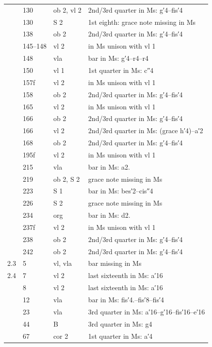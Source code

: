 \documentclass[parskip=full]{scrreprt}
\begin{document}
\begin{longtable}{lll L{10cm}}
       & 130 & ob 2, vl 2 & 2nd/3rd quarter in Ms: g′4–fis′4 \\
       & 130 & S 2     & 1st eighth: grace note missing in Ms \\
       & 138 & ob 2    & 2nd/3rd quarter in Ms: g′4–fis′4 \\
       & 145–148 & vl 2 & in Ms unison with vl 1 \\
       & 148 & vla     & bar in Ms: g′4–r4–r4 \\
       & 150 & vl 1    & 1st quarter in Ms: c″4 \\
       & 157f & vl 2   & in Ms unison with vl 1 \\
       & 158 & ob 2    & 2nd/3rd quarter in Ms: g′4–fis′4 \\
       & 165 & vl 2    & in Ms unison with vl 1 \\
       & 166 & ob 2    & 2nd/3rd quarter in Ms: g′4–fis′4 \\
       & 166 & vl 2    & 2nd/3rd quarter in Ms: (grace h′4)–a′2 \\
       & 168 & ob 2    & 2nd/3rd quarter in Ms: g′4–fis′4 \\
       & 195f & vl 2   & in Ms unison with vl 1 \\
       & 215 & vla     & bar in Ms: a2. \\
       & 219 & ob 2, S 2 & grace note missing in Ms \\
       & 223 & S 1     & bar in Ms: bes′2–cis″4 \\
       & 226 & S 2     & grace note missing in Ms \\
       & 234 & org     & bar in Ms: d2. \\
       & 237f & vl 2   & in Ms unison with vl 1 \\
       & 238 & ob 2    & 2nd/3rd quarter in Ms: g′4–fis′4 \\
       & 242 & ob 2    & 2nd/3rd quarter in Ms: g′4–fis′4 \\
  2.3  & 5   & vl, vla & bar missing in Ms \\
  2.4  & 7   & vl 2    & last sixteenth in Ms: a′16 \\
       & 8   & vl 2    & last sixteenth in Ms: a′16 \\
       & 12  & vla     & bar in Ms: fis′4.–fis′8–fis′4 \\
       & 23  & vla     & 3rd quarter in Ms: a′16–g′16–fis′16–e′16 \\
       & 44  & B       & 3rd quarter in Ms: g4 \\
       & 67  & cor 2   & 1st quarter in Ms: a′4 \\

\end{longtable}
\end{document}

